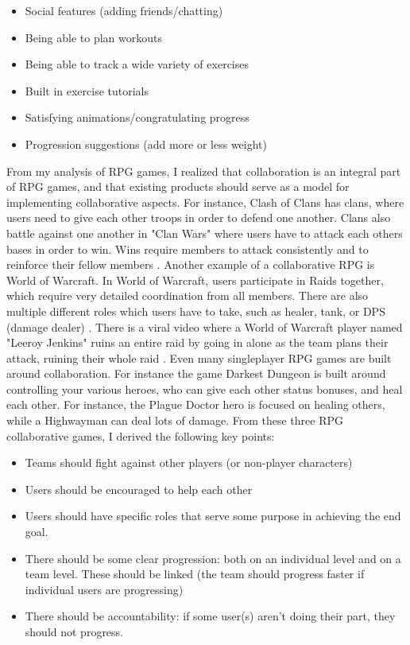 \documentclass{l4proj}
\begin{document}
\begin{itemize}    
    \item
      Social features (adding friends/chatting)
    \item
      Being able to plan workouts
    \item
      Being able to track a wide variety of exercises
    \item 
      Built in exercise tutorials
    \item
      Satisfying animations/congratulating progress
    \item
      Progression suggestions (add more or less weight)
\end{itemize}

From my analysis of RPG games, I realized that collaboration is an integral part of RPG games, and that existing products should serve as a model for implementing collaborative aspects. For instance, Clash of Clans has clans, where users need to give each other troops in order to defend one another. Clans also battle against one another in "Clan Wars" where users have to attack each others bases in order to win. Wins require members to attack consistently and to reinforce their fellow members \citep{coc}. 
Another example of a collaborative RPG is World of Warcraft. In World of Warcraft, users participate in Raids together, which require very detailed coordination from all members. There are also multiple different roles which users have to take, such as healer, tank, or DPS (damage dealer) \citep{wow}. There is a viral video where a World of Warcraft player named "Leeroy Jenkins" ruins an entire raid by going in alone as the team plans their attack, ruining their whole raid \citep{leeroy_jenkins}. Even many singleplayer RPG games are built around collaboration. For instance the game Darkest Dungeon \citet{darkest_dungeon} is built around controlling your various heroes, who can give each other status bonuses, and heal each other. For instance, the Plague Doctor hero is focused on healing others, while a Highwayman can deal lots of damage. From these three RPG collaborative games, I derived the following key points:

\begin{itemize}    
    \item
      Teams should fight against other players (or non-player characters)
    \item
      Users should be encouraged to help each other
    \item
      Users should have specific roles that serve some purpose in achieving the end goal.
    \item 
      There should be some clear progression: both on an individual level and on a team level. These should be linked (the team should progress faster if individual users are progressing)
    \item 
      There should be accountability: if some user(s) aren't doing their part, they should not progress.
\end{itemize}
\end{document}
